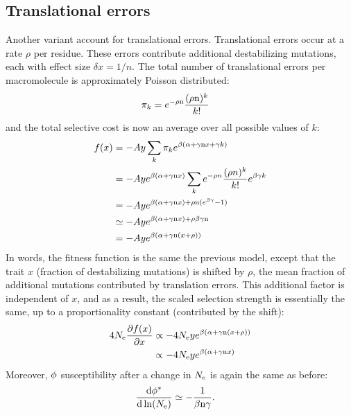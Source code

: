 \subsection{Translational errors}
Another variant account for translational errors. Translational errors occur at a rate $\rho$ per residue. These errors contribute additional destabilizing mutations, each with effect size $\delta x = 1/n$. The total number of translational errors per macromolecule is approximately Poisson distributed:
\begin{align}
\pi_k & = e^{-\rho \text{n}} \frac{(\rho \text{n})^k}{k!}
\end{align}
and the total selective cost is now an average over all possible values of $k$:
\begin{align}
f (x) & = - A y \sum_k \pi_k e^{\beta(\alpha + \gamma\text{n} x + \gamma k)}
\\
& = - A y  e^{\beta(\alpha + \gamma\text{n} x)} \sum_k e^{-\rho n} \frac{(\rho n)^k}{k!} e^{\beta \gamma k}
\\
& = - A y  e^{\beta(\alpha + \gamma\text{n} x) + \rho \text{n} (e^{\beta \gamma} -1 )}
\\
& \simeq - A y  e^{\beta(\alpha + \gamma\text{n} x) + \rho \beta \gamma \text{n}}
\\
& =- A y  e^{\beta(\alpha + \gamma \text{n} (x + \rho))}
\end{align}
In words, the fitness function is the same the previous model, except that the trait $x$ (fraction of destabilizing mutations) is shifted by $\rho$, the mean fraction of additional mutations contributed by translation errors. This additional factor is independent of $x$, and as a result, the scaled selection strength is essentially the same, up to a proportionality constant (contributed by the shift):
\begin{align}
4 N_{\mathrm{e}} \frac{\partial  f (x)}{\partial x} & \propto -4 N_{\mathrm{e}} y e^{\beta(\alpha + \gamma \text{n} (x + \rho))}
\\ & \propto -4 N_{\mathrm{e}} y e^{\beta(\alpha + \gamma\text{n} x)}
\end{align}
Moreover, $\phi$ susceptibility after a change in $N_{\mathrm{e}}$ is again the same as before:
\begin{align}
\frac{ \mathrm{d} \phi^{*}}{\mathrm{d} \ln (N_{\mathrm{e}})} & \simeq - \frac{1}{\beta \text{n} \gamma}.
\end{align}
